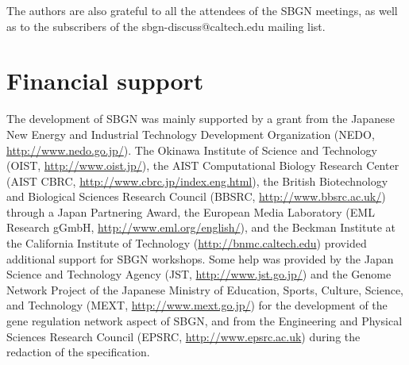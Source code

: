 The authors are also grateful to all the attendees of the SBGN meetings, as well as to the subscribers of the sbgn-discuss@caltech.edu mailing list.

\section{Financial support}

The development of SBGN was mainly supported by a grant from the Japanese New Energy and Industrial Technology Development Organization (NEDO, \url{http://www.nedo.go.jp/}). The Okinawa Institute of Science and Technology (OIST, \url{http://www.oist.jp/}), the AIST Computational Biology Research Center (AIST CBRC, \url{http://www.cbrc.jp/index.eng.html}), the British Biotechnology and Biological Sciences Research Council (BBSRC, \url{http://www.bbsrc.ac.uk/}) through a Japan Partnering Award, the European Media Laboratory (EML Research gGmbH, \url{http://www.eml.org/english/}), and the Beckman Institute at the California Institute of Technology (\url{http://bnmc.caltech.edu}) provided additional support for SBGN workshops. Some help was provided by the Japan Science and Technology Agency (JST, \url{http://www.jst.go.jp/}) and the Genome Network Project of the Japanese Ministry of Education, Sports, Culture, Science, and Technology (MEXT, \url{http://www.mext.go.jp/}) for the development of the gene regulation network aspect of SBGN, and from the Engineering and Physical Sciences Research Council (EPSRC, \url{http://www.epsrc.ac.uk}) during the redaction of the specification.

